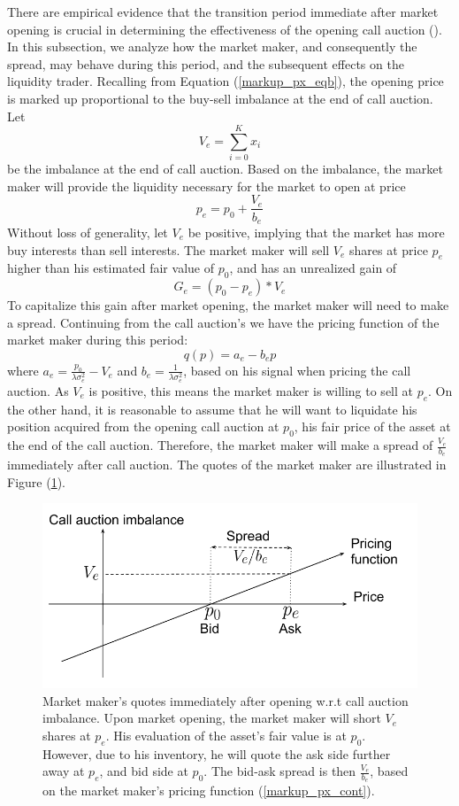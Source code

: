 \documentclass{article}
\begin{document}
There are empirical evidence that the transition period immediate after market opening is crucial in determining the effectiveness of the opening call auction (\cite{Pagano2013}). In this subsection, we analyze how the market maker, and consequently the spread, may behave during this period, and the subsequent effects on the liquidity trader. Recalling from Equation (\ref{markup_px_eqb}), the opening price is marked up proportional to the buy-sell imbalance at the end of call auction. Let
\[
  V_e = \sum_{i=0}^K x_i
\]
be the imbalance at the end of call auction. Based on the imbalance, the market maker will provide the liquidity necessary for the market to open at price
\[
  p_e = p_0 + \frac{V_e}{b_e}
\]
Without loss of generality, let $V_e$ be positive, implying that the market has more buy interests than sell interests. The market maker will sell $V_e$ shares at price $p_e$ higher than his estimated fair value of $p_0$, and has an unrealized gain of
\[
  G_e = (p_0 - p_e) * V_e
\]
To capitalize this gain after market opening, the market maker will need to make a spread. Continuing from the call auction's we have the pricing function of the market maker during this period:
\[
  q(p) = a_e - b_e p
\]
where $a_e = \frac{p_0}{\lambda \sigma_e^2} - V_e$ and $b_e=\frac{1}{\lambda \sigma_e^2}$, based on his signal when pricing the call auction. As $V_e$ is positive, this means the market maker is willing to sell at $p_e$. On the other hand, it is reasonable to assume that he will want to liquidate his position acquired from the opening call auction at $p_0$, his fair price of the asset at the end of the call auction. Therefore, the market maker will make a spread of $\frac{V_e}{b_e}$ immediately after call auction. The quotes of the market maker are illustrated in Figure (\ref{fig:mm_pricing_transition}).

\begin{figure}[h]
  \includegraphics[width=\textwidth]{MMPricingTransition}
  \caption{Market maker's quotes immediately after opening w.r.t call auction imbalance. Upon market opening, the market maker will short $V_e$ shares at $p_e$. His evaluation of the asset's fair value is at $p_0$. However, due to his inventory, he will quote the ask side further away at $p_e$, and bid side at $p_0$. The bid-ask spread is then $\frac{V_e}{b_e}$, based on the market maker's pricing function (\ref{markup_px_cont}).}
  \label{fig:mm_pricing_transition}
\end{figure}
\end{document}
